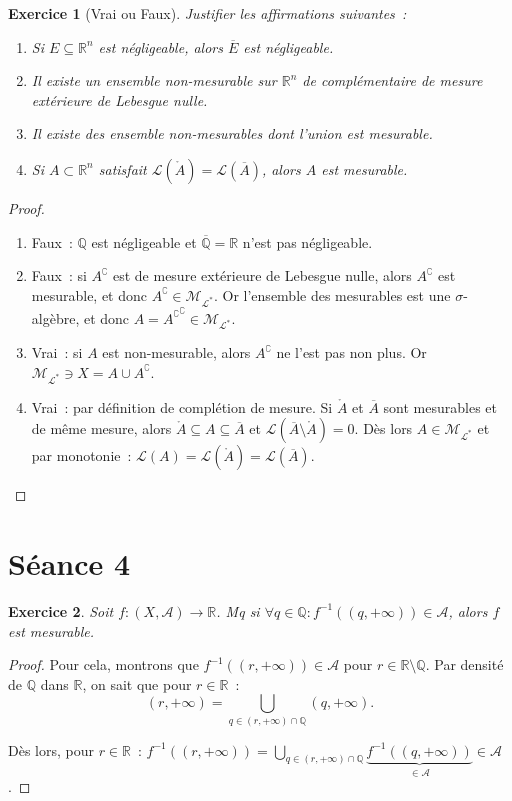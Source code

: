 \documentclass{article}
\newtheorem{ex}{Exercice}[section]
\theoremstyle{definition}
\newcommand{\pinfty}{{+\infty}}
\newcommand{\C}{\complement}
\newcommand{\Q}{{\mathbb Q}}
\newcommand{\R}{{\mathbb R}}
\begin{document}
\begin{ex}[Vrai ou Faux] Justifier les affirmations suivantes~:
\begin{enumerate}
	\item Si $E \subseteq \R^n$ est négligeable, alors $\overline E$ est négligeable.
	\item Il existe un ensemble non-mesurable sur $\R^n$ de complémentaire de mesure extérieure de Lebesgue nulle.
	\item Il existe des ensemble non-mesurables dont l'union est mesurable.
	\item Si $A \subset \R^n$ satisfait $\mathcal L(\mathring A) = \mathcal L(\overline A)$, alors $A$ est mesurable.
\end{enumerate}
\end{ex}

\begin{proof}~
\begin{enumerate}
	\item Faux~: $\Q$ est négligeable et $\overline \Q = \R$ n'est pas négligeable.
	\item Faux~: si $A^\C$ est de mesure extérieure de Lebesgue nulle, alors $A^\C$ est mesurable, et donc $A^\C \in \mathcal M_{\mathcal L^*}$. Or l'ensemble des mesurables
	est une $\sigma$-algèbre, et donc $A = {A^\C}^\C \in \mathcal M_{\mathcal L^*}$.
	\item Vrai~: si $A$ est non-mesurable, alors $A^\C$ ne l'est pas non plus. Or $\mathcal M_{\mathcal L^*} \ni X = A \cup A^\C$.
	\item Vrai~: par définition de complétion de mesure. Si $\mathring A$ et $\overline A$ sont mesurables et de même mesure, alors $\mathring A \subseteq A \subseteq \overline A$
	et $\mathcal L(\overline A \setminus \mathring A) = 0$. Dès lors $A \in \mathcal M_{\mathcal L^*}$ et par monotonie~:
	$\mathcal L(A) = \mathcal L(\mathring A) = \mathcal L(\overline A)$.
\end{enumerate}
\end{proof}

\newpage
\section{Séance 4}

\begin{ex} Soit $f : (X, \mathcal A) \to \R$. Mq si $\forall q \in \Q : f^{-1}((q, \pinfty)) \in \mathcal A$, alors $f$ est mesurable.
\end{ex}

\begin{proof} Pour cela, montrons que $f^{-1}((r, \pinfty)) \in \mathcal A$ pour $r \in \R \setminus \Q$. Par densité de $\Q$ dans $\R$, on sait que pour $r \in \R$~:
\[(r, \pinfty) = \bigcup_{q \in (r, \pinfty) \cap \Q}(q, \pinfty).\]

Dès lors, pour $r \in \R$~: $f^{-1}((r, \pinfty)) = \bigcup_{q \in (r, \pinfty) \cap \Q}\underbrace {f^{-1}((q, \pinfty))}_{\in \mathcal A} \in \mathcal A$.
\end{proof}
\end{document}
